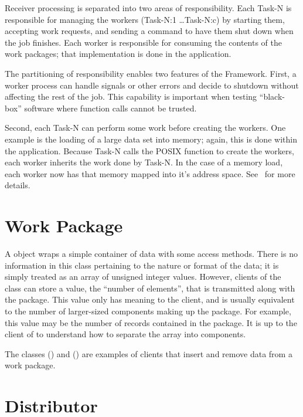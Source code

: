 Receiver processing is separated into two areas
of responsibility. Each Task-N is responsible for managing the workers
(Task-N:1 \ldots Task-N:c) by starting them, accepting work requests, and
sending a command to have them shut down when the job finishes. Each worker
is responsible for consuming the contents of the work packages; that
implementation is done in the application.

The partitioning of responsibility enables two features of the Framework.
First, a worker process can handle signals or other errors and decide to
shutdown without affecting the rest of the job. This capability is important
when testing ``black-box'' software where function calls cannot be trusted.

Second, each Task-N can perform some work before creating the workers. One
example is the loading of a large data set into memory; again, this is done
within the application. Because Task-N calls the POSIX function 
to create the workers, each worker inherits the work done by Task-N. In the
case of a memory load, each worker now has that memory mapped into it's address
space. See~ for more details.

\section{Work Package}
\label{sec-workpackage}

A  object wraps a simple container of data
with some access methods. There is no information in this class pertaining to
the nature or format of the data; it is simply treated as an array of unsigned
integer values. However, clients of the class can store a value, the ``number
of elements'', that is transmitted along with the package. This value only
has meaning to the client, and is usually equivalent to the number of
larger-sized components making up the package. For example, this value may
be the number of records contained in the package. It is up to the client
of  to understand how to separate the array into components.

The classes  ()
and  ()
are examples of  clients that insert and remove data from
a work package.

\section{Distributor}
\label{sec-workpackagedistributor}

